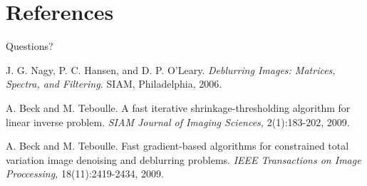\documentclass[12pt]{beamer}
\begin{document}
\section*{References}
\begin{frame}{\Huge Questions?}
\begin{thebibliography}{10}    
\beamertemplatebookbibitems %
 J. G. Nagy, P. C. Hansen, and D. P. O'Leary. \textit{Deblurring Images: Matrices, Spectra, and Filtering.} SIAM, Philadelphia, 2006. 

\beamertemplatearticlebibitems %
 A. Beck and M. Teboulle. A fast iterative shrinkage-thresholding algorithm for linear inverse problem. \textit{SIAM Journal of Imaging Sciences,} 2(1):183-202, 2009.

  A. Beck and M. Teboulle. Fast gradient-based algorithms for constrained total variation image denoising and deblurring problems. \textit{IEEE Transactions on Image Proccessing,} 18(11):2419-2434, 2009. 

\end{thebibliography}
\end{frame}
\end{document}

